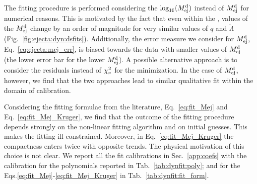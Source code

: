 The fitting procedure is performed considering the $\log_{10}(M^{\text{d}}_{\text{ej}})$ instead of 
$M^{\text{d}}_{\text{ej}}$ for numerical reasons. This is motivated by the fact that even within 
the \DSrefset{}, values of the $M^{\text{d}}_{\text{ej}}$ change by an order of magnitude for very 
similar values of $q$ and $\tilde{\Lambda}$  (Fig.~\ref{fig:ejecta:dyn:dsfits}).
%
Additionally, the error measure we consider for $M^{\text{d}}_{\text{ej}}$, Eq.~\eqref{eq:ejecta:mej_err}, 
is biased towards the data with smaller values of $M^{\text{d}}_{\text{ej}}$ (the lower error bar for the 
lower $M^{\text{d}}_{\text{ej}}$). A possible alternative approach is to consider the residuals instead of 
$\chi_{\nu}^2$ for the minimization. In the case of $M^{\text{d}}_{\text{ej}}$, however, we find that the two 
approaches lead to similar qualitative fit within the domain of calibration.
%

Considering the fitting formulae from the literature, Eq.~\eqref{eq:fit_Mej} and 
Eq.~\eqref{eq:fit_Mej_Kruger}, we find that the outcome of the fitting procedure depends 
strongly on the non-linear fitting algorithm and on initial guesses. This makes the 
fitting ill-constrained. Moreover, in Eq.~\eqref{eq:fit_Mej_Kruger} the compactness 
enters twice with opposite trends. The physical motivation of this choice is not clear.
%
We report all the fit calibrations in %
Sec.~\ref{app:coefs}
with the calibration for the polynomials reported in Tab.~\ref{tab:dynfit:poly};
and for the Eqs.\eqref{eq:fit_Mej}-\eqref{eq:fit_Mej_Kruger} 
in Tab.~\ref{tab:dynfit:fit_form}.

 

